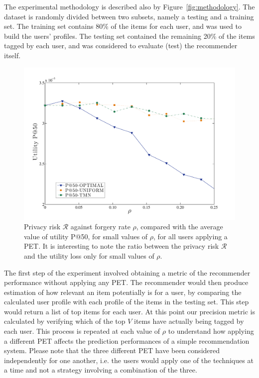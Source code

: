 The experimental methodology is described also by Figure~\ref{fig:methodology}. The dataset is randomly divided between two subsets, namely a testing and a training set. The training set contains 80\% of the items for each user, and was used to build the users' profiles. The testing set contained the remaining 20\% of the items tagged by each user, and was considered to evaluate (test) the recommender itself.

\begin{figure}[htb]  
\includegraphics[width=\textwidth]{figures/Fig6b.pdf}
\caption[Privacy Risk against forgery rate compared to the average utility value P@50]{Privacy risk $\mathcal{R}$ against forgery rate $\rho$, compared with the average value of utility P@50, for small values of $\rho$, for all users applying a PET. It is interesting to note the ratio between the privacy risk $\mathcal{R}$ and the utility loss only for small values of $\rho$.
\label{fig:Utility-Risk-Rho-Small}}
\end{figure}

The first step of the experiment involved obtaining a metric of the recommender performance without applying any PET. The recommender would then produce estimation of how relevant an item potentially is for a user, by comparing the calculated user profile with each profile of the items in the testing set. This step would return a list of top items for each user. At this point our precision metric is calculated by verifying which of the top $V$ items have actually being tagged by each user. This process is repeated at each value of $\rho$ to understand how applying a different PET affects the prediction performances of a simple recommendation system. Please note that the three different PET have been considered independently for one another, i.e. the users would apply one of the techniques at a time and not a strategy involving a combination of the three.

